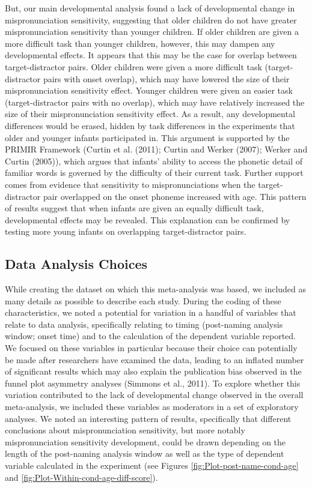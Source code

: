 \documentclass[man]{apa6}
\begin{document}
But, our main developmental analysis found a lack of developmental change in mispronunciation sensitivity, suggesting that older children do not have greater mispronunciation sensitivity than younger children. If older children are given a more difficult task than younger children, however, this may dampen any developmental effects. It appears that this may be the case for overlap between target-distractor pairs. Older children were given a more difficult task (target-distractor pairs with onset overlap), which may have lowered the size of their mispronunciation sensitivity effect. Younger children were given an easier task (target-distractor pairs with no overlap), which may have relatively increased the size of their mispronunciation sensitivity effect. As a result, any developmental differences would be erased, hidden by task differences in the experiments that older and younger infants participated in. This argument is supported by the PRIMIR Framework (Curtin et al. (2011); Curtin and Werker (2007); Werker and Curtin (2005)), which argues that infants' ability to access the phonetic detail of familiar words is governed by the difficulty of their current task. Further support comes from evidence that sensitivity to mispronunciations when the target-distractor pair overlapped on the onset phoneme increased with age. This pattern of results suggest that when infants are given an equally difficult task, developmental effects may be revealed. This explanation can be confirmed by testing more young infants on overlapping target-distractor pairs.

\hypertarget{data-analysis-choices}{%
\subsection{Data Analysis Choices}\label{data-analysis-choices}}

While creating the dataset on which this meta-analysis was based, we included as many details as possible to describe each study. During the coding of these characteristics, we noted a potential for variation in a handful of variables that relate to data analysis, specifically relating to timing (post-naming analysis window; onset time) and to the calculation of the dependent variable reported. We focused on these variables in particular because their choice can potentially be made after researchers have examined the data, leading to an inflated number of significant results which may also explain the publication bias observed in the funnel plot asymmetry analyses (Simmons et al., 2011). To explore whether this variation contributed to the lack of developmental change observed in the overall meta-analysis, we included these variables as moderators in a set of exploratory analyses. We noted an interesting pattern of results, specifically that different conclusions about mispronunciation sensitivity, but more notably mispronunciation sensitivity development, could be drawn depending on the length of the post-naming analysis window as well as the type of dependent variable calculated in the experiment (see Figures \ref{fig:Plot-post-name-cond-age} and \ref{fig:Plot-Within-cond-age-diff-score}).
\end{document}
